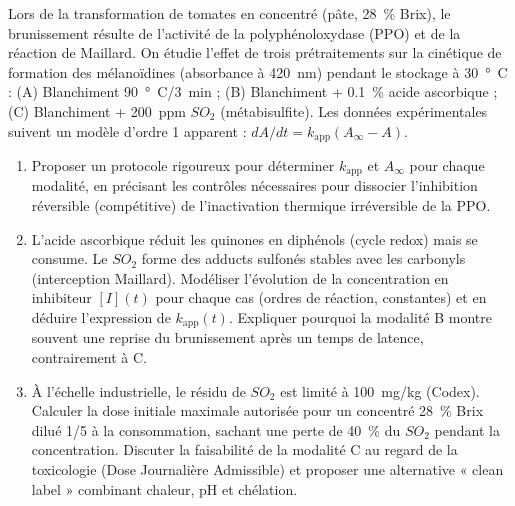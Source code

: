 \documentclass[11pt]{article}
\begin{document}
\begin{exercice}
Lors de la transformation de tomates en concentré (pâte, \SI{28}{\%} Brix), le brunissement résulte de l'activité de la polyphénoloxydase (PPO) et de la réaction de Maillard. On étudie l'effet de trois prétraitements sur la cinétique de formation des mélanoïdines (absorbance à \SI{420}{nm}) pendant le stockage à \SI{30}{°C} : (A) Blanchiment \SI{90}{°C}/\SI{3}{min} ; (B) Blanchiment + \SI{0,1}{\%} acide ascorbique ; (C) Blanchiment + \SI{200}{ppm} $SO_2$ (métabisulfite). Les données expérimentales suivent un modèle d'ordre 1 apparent : $dA/dt = k_{\text{app}} (A_{\infty} - A)$.
\begin{enumerate}
    \item Proposer un protocole rigoureux pour déterminer $k_{\text{app}}$ et $A_{\infty}$ pour chaque modalité, en précisant les contrôles nécessaires pour dissocier l'inhibition réversible (compétitive) de l'inactivation thermique irréversible de la PPO.
    \item L'acide ascorbique réduit les quinones en diphénols (cycle redox) mais se consume. Le $SO_2$ forme des adducts sulfonés stables avec les carbonyls (interception Maillard). Modéliser l'évolution de la concentration en inhibiteur $[I](t)$ pour chaque cas (ordres de réaction, constantes) et en déduire l'expression de $k_{\text{app}}(t)$. Expliquer pourquoi la modalité B montre souvent une reprise du brunissement après un temps de latence, contrairement à C.
    \item À l'échelle industrielle, le résidu de $SO_2$ est limité à \SI{100}{mg/kg} (Codex). Calculer la dose initiale maximale autorisée pour un concentré \SI{28}{\%} Brix dilué 1/5 à la consommation, sachant une perte de \SI{40}{\%} du $SO_2$ pendant la concentration. Discuter la faisabilité de la modalité C au regard de la toxicologie (Dose Journalière Admissible) et proposer une alternative « clean label » combinant chaleur, pH et chélation.
\end{enumerate}
\end{exercice}
\end{document}
